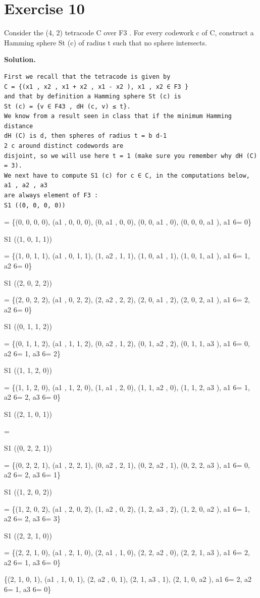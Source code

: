 \documentclass[11pt]{article}
\begin{document}
\section*{Exercise 10}
\begin{exercisebox}
Consider the (4, 2) tetracode C over F3 . For every codework c of C, construct a Hamming sphere St (c) of radius t such that no sphere intersects.

\end{exercisebox}
\begin{solutionbox}
\textbf{Solution.}

\begin{Verbatim}[fontsize=\small]
First we recall that the tetracode is given by
C = {(x1 , x2 , x1 + x2 , x1 - x2 ), x1 , x2 ∈ F3 }
and that by definition a Hamming sphere St (c) is
St (c) = {v ∈ F43 , dH (c, v) ≤ t}.
We know from a result seen in class that if the minimum Hamming distance
dH (C) is d, then spheres of radius t = b d-1
2 c around distinct codewords are
disjoint, so we will use here t = 1 (make sure you remember why dH (C) = 3).
We next have to compute S1 (c) for c ∈ C, in the computations below, a1 , a2 , a3
are always element of F3 :
S1 ((0, 0, 0, 0))
\end{Verbatim}
= \{(0, 0, 0, 0), (a1 , 0, 0, 0), (0, a1 , 0, 0), (0, 0, a1 , 0), (0, 0, 0, a1 ), a1 6= 0\}

S1 ((1, 0, 1, 1))

= \{(1, 0, 1, 1), (a1 , 0, 1, 1), (1, a2 , 1, 1), (1, 0, a1 , 1), (1, 0, 1, a1 ), a1 6= 1, a2 6= 0\}

S1 ((2, 0, 2, 2))

= \{(2, 0, 2, 2), (a1 , 0, 2, 2), (2, a2 , 2, 2), (2, 0, a1 , 2), (2, 0, 2, a1 ), a1 6= 2, a2 6= 0\}

S1 ((0, 1, 1, 2))

= \{(0, 1, 1, 2), (a1 , 1, 1, 2), (0, a2 , 1, 2), (0, 1, a2 , 2), (0, 1, 1, a3 ), a1 6= 0, a2 6= 1, a3 6= 2\}

S1 ((1, 1, 2, 0))

= \{(1, 1, 2, 0), (a1 , 1, 2, 0), (1, a1 , 2, 0), (1, 1, a2 , 0), (1, 1, 2, a3 ), a1 6= 1, a2 6= 2, a3 6= 0\}

S1 ((2, 1, 0, 1))

=

S1 ((0, 2, 2, 1))

= \{(0, 2, 2, 1), (a1 , 2, 2, 1), (0, a2 , 2, 1), (0, 2, a2 , 1), (0, 2, 2, a3 ), a1 6= 0, a2 6= 2, a3 6= 1\}

S1 ((1, 2, 0, 2))

= \{(1, 2, 0, 2), (a1 , 2, 0, 2), (1, a2 , 0, 2), (1, 2, a3 , 2), (1, 2, 0, a2 ), a1 6= 1, a2 6= 2, a3 6= 3\}

S1 ((2, 2, 1, 0))

= \{(2, 2, 1, 0), (a1 , 2, 1, 0), (2, a1 , 1, 0), (2, 2, a2 , 0), (2, 2, 1, a3 ), a1 6= 2, a2 6= 1, a3 6= 0\}

\{(2, 1, 0, 1), (a1 , 1, 0, 1), (2, a2 , 0, 1), (2, 1, a3 , 1), (2, 1, 0, a2 ), a1 6= 2, a2 6= 1, a3 6= 0\}

\end{solutionbox}
\end{document}
